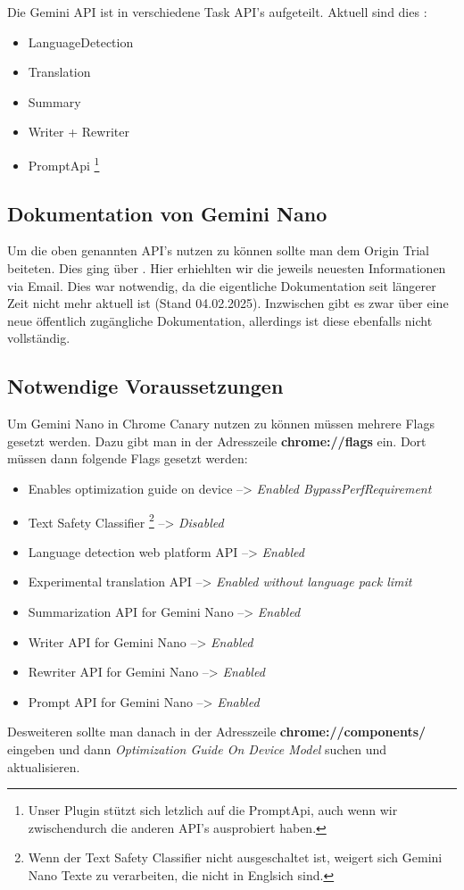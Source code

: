 Die Gemini API ist in verschiedene Task API's aufgeteilt. Aktuell sind dies \cite{gemini-nano-apis}:
\begin{itemize}
    \item LanguageDetection
    \item Translation
    \item Summary
    \item Writer + Rewriter
    \item PromptApi \footnote{Unser Plugin stützt sich letzlich auf die PromptApi, auch wenn wir zwischendurch die anderen API's ausprobiert haben.}
\end{itemize} 

\subsection{Dokumentation von Gemini Nano}

Um die oben genannten API's nutzen zu können sollte man dem Origin Trial beiteten. Dies ging über \cite{gemini-nano-origin-trial}. Hier erhiehlten wir die jeweils neuesten Informationen via Email. Dies war notwendig, da die eigentliche Dokumentation \cite{old-doku-language-detection-api, old-doku-translation-api,old-doku-summarization-api,old-doku-writer-api,old-doku-prompt-api} seit längerer Zeit nicht mehr aktuell ist (Stand 04.02.2025). Inzwischen gibt es zwar über \cite{gemini-nano-build-in-ai} eine neue öffentlich zugängliche Dokumentation, allerdings ist diese ebenfalls nicht vollständig.

\subsection{Notwendige Voraussetzungen}

Um Gemini Nano in Chrome Canary nutzen zu können müssen mehrere Flags gesetzt werden. Dazu gibt man in der Adresszeile \textbf{chrome://flags} ein. Dort müssen dann folgende Flags gesetzt werden:
\begin{itemize}
    \item Enables optimization guide on device --> \emph{Enabled BypassPerfRequirement}
    \item Text Safety Classifier \footnote{Wenn der Text Safety Classifier nicht ausgeschaltet ist, weigert sich Gemini Nano Texte zu verarbeiten, die nicht in Englsich sind.} --> \emph{Disabled}
    \item Language detection web platform API --> \emph{Enabled}
    \item Experimental translation API --> \emph{Enabled without language pack limit}
    \item Summarization API for Gemini Nano --> \emph{Enabled}
    \item Writer API for Gemini Nano --> \emph{Enabled}
    \item Rewriter API for Gemini Nano --> \emph{Enabled}
    \item Prompt API for Gemini Nano --> \emph{Enabled}
\end{itemize}

Desweiteren sollte man danach in der Adresszeile \textbf{chrome://components/} eingeben und dann \emph{Optimization Guide On Device Model} suchen und aktualisieren.